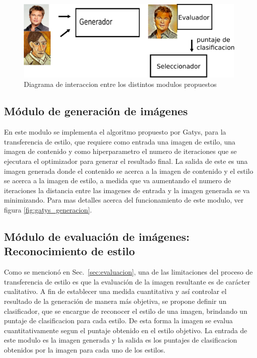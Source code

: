 \documentclass[a4paper,11pt,spanish]{book}
\begin{document}
    \begin{figure}[h]
      \begin{center}
	\includegraphics[width=\linewidth]{./img/diagrama.png}
      \end{center}
      \caption{Diagrama de interaccion entre los distintos modulos propuestos}
      \label{fig:diagrama}
    \end{figure}

    \subsection{Módulo de generación de imágenes \label{sec:generador}}
      En este modulo se implementa el algoritmo propuesto por Gatys, para la transferencia de estilo, que requiere como entrada una imagen de estilo,
      una imagen de contenido y como hiperparametro el numero de iteraciones que se ejecutara el optimizador para generar el resultado final.
      La salida de este es una imagen generada donde el contenido se acerca a la imagen de contenido y el estilo se acerca a la imagen de estilo, a medida
      que va aumentando el numero de iteraciones la distancia entre las imagenes de entrada y la imagen generada se va minimizando. Para mas detalles
      acerca del funcionamiento de este modulo, ver figura \ref{fig:gatys_generacion}.
    
    \subsection{Módulo de evaluación de imágenes: Reconocimiento de estilo \label{sec:evaluador}}
      Como se mencionó en Sec.~\ref{sec:evaluacion}, una de las limitaciones del proceso de transferencia de estilo es que la evaluación de
      la imagen resultante es de carácter cualitativo. A fin de establecer una medida cuantitativa y así controlar el resultado de la generación de
      manera más objetiva, se propone definir un clasificador, que se encargue de reconocer el estilo de una imagen, brindando un puntaje de clasificacion para cada estilo.
      De esta forma la imagen se evalua cuantitativamente segun el puntaje obtenido en el estilo objetivo.
      La entrada de este modulo es la imagen generada y la salida es los puntajes de clasificacion obtenidos por la imagen para cada uno de los estilos.\\
\end{document}
